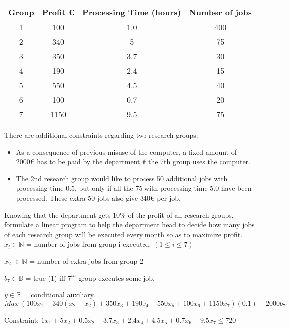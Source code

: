 \documentclass[11pt, oneside]{article}   	%
\begin{document}
\begin{center}
\begin{tabular}{ |c|c|c|c| } 
 \hline
  Group & Profit \euro{} & Processing Time (hours) & Number of jobs\\ 
  \hline
  1 & 100 & 1.0 & 400\\ 
  2 & 340 & 5 & 75\\ 
  3 & 350 & 3.7 & 30\\ 
  4 & 190 & 2.4 & 15\\ 
  5 & 550 & 4.5 & 40\\ 
  6 & 100 & 0.7 & 20\\ 
  7 & 1150 & 9.5 & 75\\ 
 \hline
\end{tabular}
\end{center}

There are additional constraints regarding two research groups:

\begin{itemize}
\item As a consequence of previous misuse of the computer, a fixed amount of 2000\euro{} has to be paid by the department if the 7th group uses the computer.
\item The 2nd research group would like to process 50 additional jobs with processing time 0.5, but only if all the 75 with processing time 5.0 have been processed. These extra 50 jobs also give 340\euro{} per job.
\end{itemize}

Knowing that the department gets 10\% of the profit of all research groups, formulate a linear program to help the department head to decide how many jobs of each research group will be executed every month so as to maximize profit.\\

$x_i \in \mathbb{N}{}$ = number of jobs from group i executed. $(1 \leq i \leq 7)$

$\widetilde{x}_2$ $\in \mathbb{N}{}$ = number of extra jobs from group 2.

$b_7 \in \mathbb{B}{}$ = true ($1$) iff $7^{th}$ group executes some job.

$y \in \mathbb{B}{}$ = conditional auxiliary.\\

$$Max{}\  (100 x_1 + 340 (x_2 + \widetilde{x}_2) + 350 x_3 + 190 x_4 + 550 x_5 + 100 x_6 + 1150 x_7) (0.1) - 2000 b_7$$

Constraint: $1 x_1 + 5 x_2 + 0.5 \widetilde{x}_2 + 3.7 x_3 + 2.4 x_4 + 4.5 x_5 + 0.7 x_6 + 9.5 x_7 \leq 720$
\end{document}
